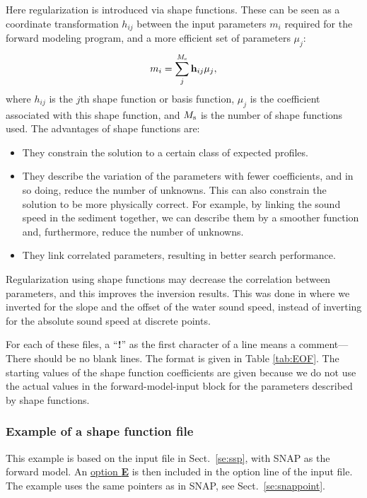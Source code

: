 \documentclass{saclantc}
\begin{document}
Here regularization is introduced via shape functions. These can be 
seen as a coordinate transformation $h_{ij}$ between the input
parameters $m_i$ required for the forward modeling
program, and a more efficient set of parameters $\mu_j$:
\begin{equation}
 {m_i}= \sum_j^{M_{\rm s}} {\bf h}_{ij} \mu_j,
\label{eq:shp}
\end{equation}
where $ { h}_{ij}$ is the $j$th shape function or basis function,
$\mu_j$ is the coefficient
associated with this shape function, and $M_{\rm s}$ is the number of shape functions
used. The advantages of shape functions are:
\begin{itemize}
\item They constrain the solution to a certain class of 
expected profiles.
\item They describe the variation of the parameters with 
fewer coefficients, and in so doing, reduce the number of unknowns. This can
also constrain the solution to be more physically correct. For example,
by linking the sound speed in the sediment together, we can
describe them by a smoother function and, furthermore, reduce the number of unknowns. 
\item They link correlated  parameters, resulting in  better search 
performance.
\end{itemize}

Regularization using shape functions may 
decrease the correlation between parameters, and this improves the inversion
results. This was done in \cite{gerstoft:jca94} where we 
inverted for the slope 
and the offset of the water sound speed, instead of
inverting for  the absolute sound speed at discrete points. 

For each of these files, a ``{\bf !}'' as the first character of a line  means
a comment--- There should be no blank lines.
The format is given in Table  \ref{tab:EOF}.
The starting values of the shape function coefficients are given because we do not
use the actual values in the forward-model-input block for the parameters
described by shape functions.



\subsubsection{Example of a shape function file}
This example is based on the  input file in Sect.\ \ref{se:ssp},
with {\sf SNAP} as the forward model. An \underline{option {\bf E}} is then included in the option line of
the input file. The example uses the same pointers as in {\sf SNAP}, see Sect.\
\ref{se:snappoint}.
\end{document}
